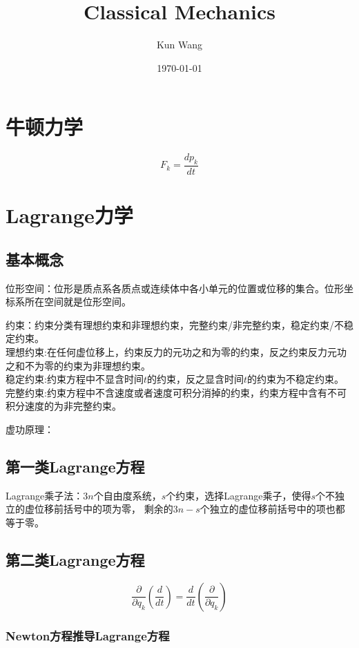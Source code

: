 \documentclass[12pt]{article}
\title{Classical Mechanics}
\author{Kun Wang}
\date{\today}
\numberwithin{equation}{section}
\begin{document}
        \maketitle
        \section{牛顿力学}
        \begin{equation}
            F_k=\frac{dp_k}{dt}
        \end{equation}

        \section{Lagrange力学}
        \subsection{基本概念\cite{2006shen}}
        位形空间：位形是质点系各质点或连续体中各小单元的位置或位移的集合。位形坐标系所在空间就是位形空间。\par
        约束：约束分类有理想约束和非理想约束，完整约束/非完整约束，稳定约束/不稳定约束。\\
        理想约束:在任何虚位移上，约束反力的元功之和为零的约束，反之约束反力元功之和不为零的约束为非理想约束。\\
        稳定约束:约束方程中不显含时间$t$的约束，反之显含时间$t$的约束为不稳定约束。\\
        完整约束:约束方程中不含速度或者速度可积分消掉的约束，约束方程中含有不可积分速度的为非完整约束。
        \par
        虚功原理：
        \subsection{第一类Lagrange方程}
	Lagrange乘子法：$3n$个自由度系统，$s$个约束，选择Lagrange乘子，使得$s$个不独立的虚位移前括号中的项为零，
	剩余的$3n-s$个独立的虚位移前括号中的项也都等于零。
        \subsection{第二类Lagrange方程}
        \begin{equation}
            \frac{\partial}{\partial q_k}\left(\frac{d}{dt}\right)=\frac{d}{dt}\left(\frac{\partial}{\partial q_k}\right)
        \end{equation}

	    \subsubsection{Newton方程推导Lagrange方程}
\end{document}
